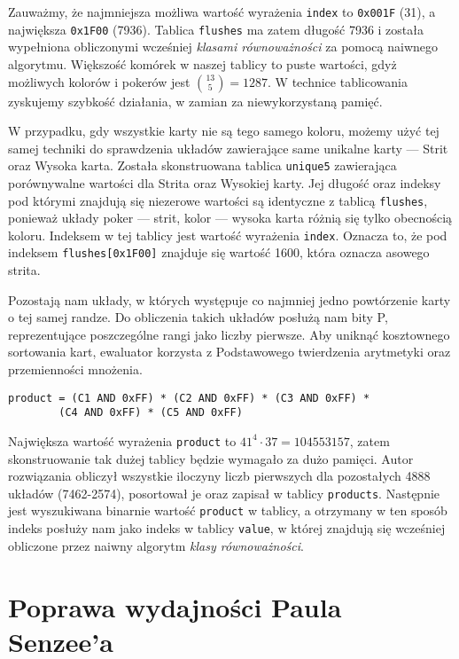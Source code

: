 Zauważmy, że najmniejsza możliwa wartość wyrażenia \verb+index+ to \verb+0x001F+ (31), a największa \verb+0x1F00+ (7936). Tablica \verb+flushes+ ma zatem długość 7936 i została wypełniona obliczonymi wcześniej \emph{klasami równoważności} za pomocą naiwnego algorytmu. Większość komórek w naszej tablicy to puste wartości, gdyż możliwych kolorów i pokerów jest $\binom{13}{5}= 1287$. W technice tablicowania \cite{lookup-tables} zyskujemy szybkość działania, w zamian za niewykorzystaną pamięć. 

W przypadku, gdy wszystkie karty nie są tego samego koloru, możemy użyć tej samej techniki do sprawdzenia układów zawierające same unikalne karty --- Strit oraz Wysoka karta. Została skonstruowana tablica \verb+unique5+ zawierająca porównywalne wartości dla Strita oraz Wysokiej karty. Jej długość oraz indeksy pod którymi znajdują się niezerowe wartości są identyczne z tablicą \verb+flushes+, ponieważ układy poker --- strit, kolor --- wysoka karta różnią się tylko obecnością koloru. Indeksem w tej tablicy jest wartość wyrażenia \verb+index+. Oznacza to, że pod indeksem \verb+flushes[0x1F00]+ znajduje się wartość 1600, która oznacza asowego strita.

Pozostają nam układy, w których występuje co najmniej jedno powtórzenie karty o tej samej randze. Do obliczenia takich układów posłużą nam bity P, reprezentujące poszczególne rangi jako liczby pierwsze.
Aby uniknąć kosztownego sortowania kart, ewaluator korzysta z Podstawowego twierdzenia arytmetyki \cite{theorem-of-arithmetic} oraz przemienności mnożenia.

\begin{verbatim}
product = (C1 AND 0xFF) * (C2 AND 0xFF) * (C3 AND 0xFF) * 
        (C4 AND 0xFF) * (C5 AND 0xFF)
\end{verbatim}

Największa wartość wyrażenia \verb+product+ to $41^4 \cdot 37=104553157$, zatem skonstruowanie tak dużej tablicy będzie wymagało za dużo pamięci. Autor rozwiązania obliczył wszystkie iloczyny liczb pierwszych dla pozostałych 4888 układów (7462-2574), posortował je oraz zapisał w tablicy \verb+products+. Następnie jest wyszukiwana binarnie \cite{binary-search} wartość \verb+product+ w tablicy, a otrzymany w ten sposób indeks posłuży nam jako indeks w tablicy \verb+value+, w której znajdują się wcześniej obliczone przez naiwny algorytm \emph{klasy równoważności}.

\section{Poprawa wydajności Paula Senzee'a}

